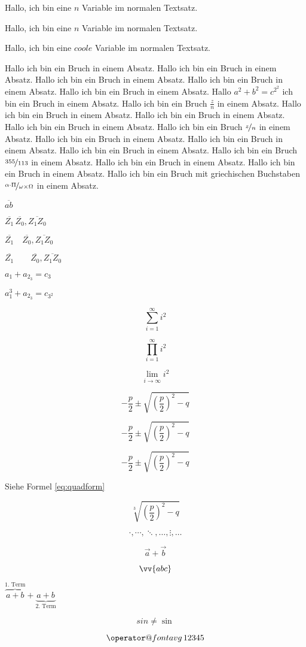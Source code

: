 \documentclass[12pt,ngerman,parskip=full]{scrartcl}
\makeatletter
\newcommand*\avg{\mathop{\operator@font avg}}
\makeatother
\begin{document}
Hallo, ich bin eine $n$ Variable im normalen Textsatz.

Hallo, ich bin eine \(n\) Variable im normalen Textsatz.

Hallo, ich bin eine \(coole\) Variable im normalen Textsatz. %

Hallo ich bin ein Bruch in einem Absatz. Hallo ich bin ein Bruch in einem Absatz. Hallo ich bin ein Bruch in einem Absatz. Hallo ich bin ein Bruch in einem Absatz. Hallo ich bin ein Bruch in einem Absatz. Hallo \(a^2+b^2 =c^{2^2}\) ich bin ein Bruch in einem Absatz. Hallo ich bin ein Bruch \( \frac{z}{n}\) in einem Absatz. Hallo ich bin ein Bruch in einem Absatz. Hallo ich bin ein Bruch in einem Absatz. Hallo ich bin ein Bruch in einem Absatz. Hallo ich bin ein Bruch \( \nicefrac{z}{n}\) in einem Absatz. Hallo ich bin ein Bruch in einem Absatz. Hallo ich bin ein Bruch in einem Absatz. Hallo ich bin ein Bruch in einem Absatz. Hallo ich bin ein Bruch \( \nicefrac{355}{113}\) in einem Absatz. Hallo ich bin ein Bruch in einem Absatz. Hallo ich bin ein Bruch in einem Absatz. Hallo ich bin ein Bruch mit griechischen Buchstaben  \( \nicefrac{\alpha \cdot \Pi }{\omega \times \Omega}\) in einem Absatz.

\(  \overline{ab} \)

\( \overline{Z_{1}}\,\overline{Z_{0}},  \overline{Z_{1}Z_{0}}  \)

\( \overline{Z_{1}}\quad\overline{Z_{0}},  \overline{Z_{1}Z_{0}}  \)

\( \overline{Z_{1}}\qquad\overline{Z_{0}},  \overline{Z_{1}Z_{0}}  \)

\( a_1 + a_{2_3} = c_3  \)

\( a_1^3 + a_{2_3} = c_{3^2}  \)

\[  \sum_{i=1}^\infty i^2  \]

\[  \prod_{i=1}^\infty i^2  \]

\[ \lim_{i \rightarrow \infty} i^2  \]

$$  - \frac{p}{2} \pm \sqrt{ \left(\frac{p}{2}\right)^2 - q  }    $$ %

\[  - \frac{p}{2} \pm \sqrt{ \left(\frac{p}{2}\right)^2 - q  }    \] %

\begin{equation}
 - \frac{p}{2} \pm \sqrt{ \left(\frac{p}{2}\right)^2 - q  } \label{eq:quadform}
\end{equation}

Siehe Formel \ref{eq:quadform}

\[  \sqrt[3]{ \left(\frac{p}{2}\right)^2 - q  }  \]

\[  \cdot, \cdots, \ddots, \ldots, \vdots, \dots    \]

\[  \vec{a} + \vec{b}   \]

\[  \vv{abc}   \]

\(   \overbrace{a + b }^{ \text{1. Term} }   + \underbrace{a + b }_{ \text{2. Term} }   \)

\[ sin \not= \sin  \]

\[ \avg 12345  \]
\end{document}
